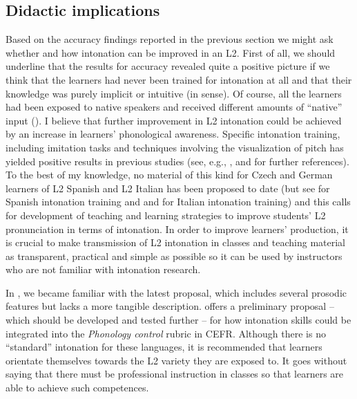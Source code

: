 \subsection{Didactic implications}\label{sec:5.2.2}

Based on the accuracy findings reported in the previous section we might ask whether and how intonation can be improved in an L2. First of all, we should underline that the results for accuracy revealed quite a positive picture if we think that the learners had never been trained for intonation at all and that their knowledge was purely implicit or intuitive (in   sense). Of course, all the learners had been exposed to native speakers and received different amounts of “native” input (). I believe that further improvement in L2 intonation could be achieved by an increase in learners’ phonological awareness. Specific intonation training, including imitation tasks and techniques involving the visualization of pitch has yielded positive results in previous studies (see, e.g., \citealt{Chun1998, NiebuhrEtAl2017},  and  for further references). To the best of my knowledge, no material of this kind for Czech and German learners of L2 Spanish and L2 Italian has been proposed to date (but see  \citealt{CortésMoreno2002, Elvira-García2016} for Spanish intonation training and \citealt{Mocciaro2014} and \citealt{Nicora2020} for Italian intonation training) and this calls for development of teaching and learning strategies to improve students’ L2 pronunciation in terms of intonation. In order to improve learners’ production, it is crucial to make transmission of L2 intonation in classes and teaching material as transparent, practical and simple as possible so it can be used by instructors who are not familiar with intonation research.


In , we became familiar with the  latest proposal, which includes several prosodic features but lacks a more tangible description.  offers a preliminary proposal -- which should be developed and tested further -- for how intonation skills could be integrated into the \textit{Phonology control} rubric in CEFR. Although there is no “standard” intonation for these languages, it is recommended that learners orientate themselves towards the L2 variety they are exposed to. It goes without saying that there must be professional instruction in classes so that learners are able to achieve such competences.

